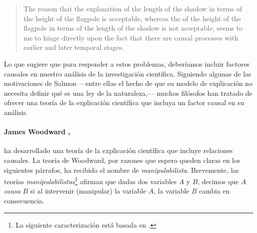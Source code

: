 \begin{quote}
 The reason that the explanation of the length of the shadow in terms
 of the height of the flagpole is acceptable, whereas the
  of the height of the flagpole in terms of the
 length of the shadow is not acceptable, seems to me to hinge directly
 upon the fact that there are causal processes with earlier and later
 temporal stages.
 \parencite{Salmon1970}
\end{quote}

Lo que sugiere que para responder a estos problemas, deberíamos
incluir factores causales en nuestro análisis de la investigación
científica. Siguiendo algunas de las motivaciones de Salmon ---entre
ellas el hecho de que su modelo de explicación no necesita definir
qué es una ley de la naturaleza,--- muchos filósofos han tratado de
ofrecer una teoría de la explicación científica que incluya un factor
causal en su análisis.

\paragraph{James Woodward \parencite{Woodward2004},} ha desarrollado
una
teoría de la explicación científica que incluye relaciones causales.
La teoría de Woodward, por razones que espero queden claras en los
siguientes párrafos, ha recibido el nombre de \emph{manipulabilista}.
Brevemente, las teorías \emph{manipulabilistas}\footnote{ La
 siguiente caracterización está basada en
 \parencite{sep-causation-mani, sep-causal-explanation-science,
  Woodward2004, Woodward2000-WOOEAI}.
} afirman que dadas dos variables $A$ y $B$, decimos que $A$
\emph{causa
} $B$ si al intervenir (manipular) la variable $A$, la variable $B$
cambia en consecuencia.

